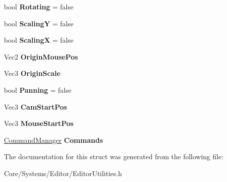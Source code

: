 \begin{DoxyCompactItemize}
\item 
\hypertarget{structDCEngine_1_1EditorConfig_acf9759a58b6f350d3d651ca2f0d1b3dd}{bool {\bfseries Rotating} = false}\label{structDCEngine_1_1EditorConfig_acf9759a58b6f350d3d651ca2f0d1b3dd}

\item 
\hypertarget{structDCEngine_1_1EditorConfig_a11097b0b7a032a414f174dbb1709f12a}{bool {\bfseries Scaling\-Y} = false}\label{structDCEngine_1_1EditorConfig_a11097b0b7a032a414f174dbb1709f12a}

\item 
\hypertarget{structDCEngine_1_1EditorConfig_ab3d54e6e035035a882b1d64aaf95af90}{bool {\bfseries Scaling\-X} = false}\label{structDCEngine_1_1EditorConfig_ab3d54e6e035035a882b1d64aaf95af90}

\item 
\hypertarget{structDCEngine_1_1EditorConfig_abb3666511134d6813b918ac0fe5100fd}{Vec2 {\bfseries Origin\-Mouse\-Pos}}\label{structDCEngine_1_1EditorConfig_abb3666511134d6813b918ac0fe5100fd}

\item 
\hypertarget{structDCEngine_1_1EditorConfig_ab2c7a53f20a47ab847d30951949f4877}{Vec3 {\bfseries Origin\-Scale}}\label{structDCEngine_1_1EditorConfig_ab2c7a53f20a47ab847d30951949f4877}

\item 
\hypertarget{structDCEngine_1_1EditorConfig_a7312fe41c1c722bbce1e5e18875ee573}{bool {\bfseries Panning} = false}\label{structDCEngine_1_1EditorConfig_a7312fe41c1c722bbce1e5e18875ee573}

\item 
\hypertarget{structDCEngine_1_1EditorConfig_a0f695e3d5254e8f1ffab3839671a99b5}{Vec3 {\bfseries Cam\-Start\-Pos}}\label{structDCEngine_1_1EditorConfig_a0f695e3d5254e8f1ffab3839671a99b5}

\item 
\hypertarget{structDCEngine_1_1EditorConfig_abc4d61c9427a470148845ef3b4ddff10}{Vec3 {\bfseries Mouse\-Start\-Pos}}\label{structDCEngine_1_1EditorConfig_abc4d61c9427a470148845ef3b4ddff10}

\item 
\hypertarget{structDCEngine_1_1EditorConfig_a7b6dbf5829f25aef1e6335e47481737b}{\hyperlink{classDCEngine_1_1CommandManager}{Command\-Manager} {\bfseries Commands}}\label{structDCEngine_1_1EditorConfig_a7b6dbf5829f25aef1e6335e47481737b}

\end{DoxyCompactItemize}


The documentation for this struct was generated from the following file\-:\begin{DoxyCompactItemize}
\item 
Core/\-Systems/\-Editor/Editor\-Utilities.\-h\end{DoxyCompactItemize}
